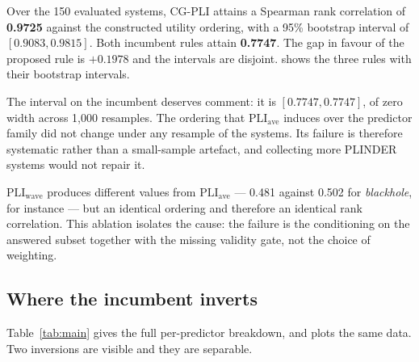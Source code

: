 \documentclass{article} %
\begin{document}
Over the 150 evaluated systems, CG-PLI attains a Spearman rank correlation of
\textbf{0.9725} against the constructed utility ordering, with a 95\% bootstrap interval
of $[0.9083, 0.9815]$. Both incumbent rules attain \textbf{0.7747}. The gap in favour of
the proposed rule is $+0.1978$ and the intervals are disjoint.  shows the
three rules with their bootstrap intervals.

The interval on the incumbent deserves comment: it is $[0.7747, 0.7747]$, of zero width
across 1{,}000 resamples. The ordering that $\mathrm{PLI}_{\text{ave}}$ induces over the
predictor family did not change under any resample of the systems. Its failure is
therefore systematic rather than a small-sample artefact, and collecting more PLINDER
systems would not repair it.

$\mathrm{PLI}_{\text{wave}}$ produces different values from $\mathrm{PLI}_{\text{ave}}$
--- 0.481 against 0.502 for \emph{blackhole}, for instance --- but an identical ordering
and therefore an identical rank correlation. This ablation isolates the cause: the
failure is the conditioning on the answered subset together with the missing validity
gate, not the choice of weighting.

\subsection{Where the incumbent inverts}

Table~\ref{tab:main} gives the full per-predictor breakdown, and  plots
the same data. Two inversions are visible and they are separable.
\end{document}
